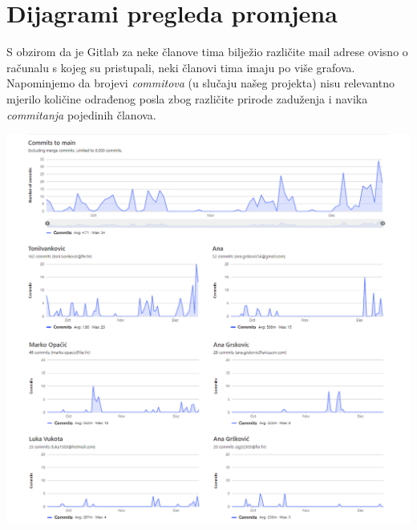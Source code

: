 					
		\eject
		\section*{Dijagrami pregleda promjena}
		
		
        \par{
        S obzirom da je Gitlab za neke članove tima bilježio različite mail adrese ovisno o računalu s kojeg su pristupali, neki članovi tima imaju po više grafova. Napominjemo da brojevi \textit{commitova} (u slučaju našeg projekta) nisu relevantno mjerilo količine odrađenog posla zbog različite prirode zaduženja i navika \textit{commitanja} pojedinih članova.
        } \newline
            	    \begin{minipage}{\linewidth}
                    	\includegraphics[scale=0.47]{slike/Graf aktivnosti.png} %
            			\centering
                        \label{fig:grarf_aktivnosti_1}
                    \end{minipage}
                    
